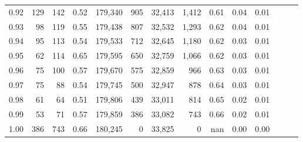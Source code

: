 \begin{tabular}{rrrrrrrrrrrrrr}
0.92 &    129 &  142 &  0.52 &  179,340 &      905 &  32,413 &   1,412 &  0.61 &  0.04 &      0.01 \\
0.93 &     98 &  119 &  0.55 &  179,438 &      807 &  32,532 &   1,293 &  0.62 &  0.04 &      0.01 \\
0.94 &     95 &  113 &  0.54 &  179,533 &      712 &  32,645 &   1,180 &  0.62 &  0.03 &      0.01 \\
0.95 &     62 &  114 &  0.65 &  179,595 &      650 &  32,759 &   1,066 &  0.62 &  0.03 &      0.01 \\
0.96 &     75 &  100 &  0.57 &  179,670 &      575 &  32,859 &     966 &  0.63 &  0.03 &      0.01 \\
0.97 &     75 &   88 &  0.54 &  179,745 &      500 &  32,947 &     878 &  0.64 &  0.03 &      0.01 \\
0.98 &     61 &   64 &  0.51 &  179,806 &      439 &  33,011 &     814 &  0.65 &  0.02 &      0.01 \\
0.99 &     53 &   71 &  0.57 &  179,859 &      386 &  33,082 &     743 &  0.66 &  0.02 &      0.01 \\
1.00 &    386 &  743 &  0.66 &  180,245 &        0 &  33,825 &       0 &   nan &  0.00 &      0.00 \\
\bottomrule
\end{tabular}
